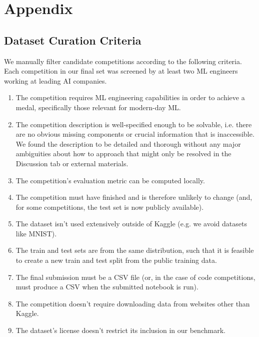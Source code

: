 \documentclass{article} %
\begin{document}



\appendix
\section{Appendix}

\subsection{Dataset Curation Criteria}
\label{app:dataset-criteria}

We manually filter candidate competitions according to the following criteria. Each competition in our final set was screened by at least two ML engineers working at leading AI companies.

\begin{enumerate}
    \item The competition requires ML engineering capabilities in order to achieve a medal, specifically those relevant for modern-day ML.
    \item The competition description is well-specified enough to be solvable, i.e. there are no obvious missing components or crucial information that is inaccessible. We found the description to be detailed and thorough without any major ambiguities about how to approach that might only be resolved in the Discussion tab or external materials.
    \item The competition's evaluation metric can be computed locally.
    \item The competition must have finished and is therefore unlikely to change (and, for some competitions, the test set is now publicly available).
    \item The dataset isn't used extensively outside of Kaggle (e.g. we avoid datasets like MNIST).
    \item The train and test sets are from the same distribution, such that it is feasible to create a new train and test split from the public training data.
    \item The final submission must be a CSV file (or, in the case of code competitions, must produce a CSV when the submitted notebook is run).
    \item The competition doesn't require downloading data from websites other than Kaggle.
    \item The dataset’s license doesn't restrict its inclusion in our benchmark.
\end{enumerate}
\end{document}

